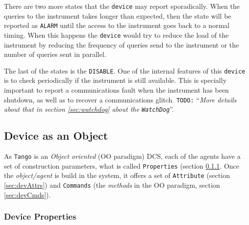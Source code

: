 \documentclass[a4paper,10pt]{article}
\newcommand{\todo}[1]{\texttt{\color{red}TODO:} ``\emph{#1}''}
\begin{document}
There are two more states that the \texttt{device} may report sporadically. When the queries to the instrument takes longer than expected, then the state will be reported as \texttt{ALARM} until the access to the instrument goes back to a normal timing. When this happens the \texttt{device} would try to reduce the load of the instrument by reducing the frequency of queries send to the instrument or the number of queries sent in parallel.

The last of the states is the \texttt{DISABLE}. One of the internal features of this \texttt{device} is to check periodically if the instrument is still available. This is specially important to report a communications fault when the instrument has been shutdown, as well as to recover a communications glitch. \todo{More details about that in section \ref{sec:watchdog} about the \texttt{WatchDog}}.

\subsection{Device as an Object}

As \texttt{Tango} is an \emph{Object oriented} (OO paradigm) DCS, each of the agents have a set of construction parameters, what is called \texttt{Properties} (section \ref{sec:devProp}. Once the \emph{object/agent} is build in the system, it offers a set of \texttt{Attribute} (section \ref{sec:devAttrs}) and \texttt{Commands} (the \emph{methods} in the OO paradigm, section \ref{sec:devCmds}).

\subsubsection{Device Properties}\label{sec:devProp}
\end{document}
